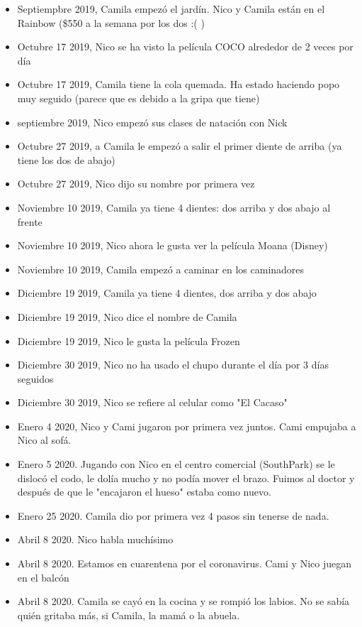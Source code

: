 \documentclass[12pt]{article}
\begin{document}
\begin{itemize}
  \item Septiempbre 2019, Camila empez\'o el jard\'in. Nico y Camila est\'an en el Rainbow (\$550 a la semana por los dos :( )
  \item Octubre 17 2019, Nico se ha visto la pel\'icula COCO alrededor de 2 veces por d\'ia
  \item Octubre 17 2019, Camila tiene la cola quemada. Ha estado haciendo popo muy seguido (parece que es debido a la gripa que tiene)
  \item septiembre 2019, Nico empez\'o sus clases de nataci\'on con Nick
  \item Octubre 27 2019, a Camila le empez\'o a salir el primer diente de arriba (ya tiene los dos de abajo)
  \item Octubre 27 2019, Nico dijo su nombre por primera vez
  \item Noviembre 10 2019, Camila ya tiene 4 dientes: dos arriba y dos abajo al frente
  \item Noviembre 10 2019, Nico ahora le gusta ver la pel\'icula Moana (Disney)
  \item Noviembre 10 2019, Camila empez\'o a caminar en los caminadores
  \item Diciembre 19 2019, Camila ya tiene 4 dientes, dos arriba y dos abajo
  \item Diciembre 19 2019, Nico dice el nombre de Camila
  \item Diciembre 19 2019, Nico le gusta la pel\'icula Frozen
  \item Diciembre 30 2019, Nico no ha usado el chupo durante el d\'ia por 3 d\'ias seguidos
  \item Diciembre 30 2019, Nico se refiere al celular como "El Cacaso"
  \item Enero 4 2020, Nico y Cami jugaron por primera vez juntos. Cami empujaba a Nico al sof\'a.
  \item Enero 5 2020. Jugando con Nico en el centro comercial (SouthPark) se le disloc\'o el codo, le dol\'ia mucho y no pod\'ia mover el brazo. Fuimos al doctor y despu\'es de que le "encajaron el hueso" estaba como nuevo.
  \item Enero 25 2020. Camila dio por primera vez 4 pasos sin tenerse de nada.
  \item Abril 8 2020. Nico habla much\'isimo
  \item Abril 8 2020. Estamos en cuarentena por el coronavirus. Cami y Nico juegan en el balc\'on
  \item Abril 8 2020. Camila se cay\'o en la cocina y se rompi\'o los labios. No se sab\'ia qui\'en gritaba m\'as, si Camila, la mam\'a o la abuela.

\end{itemize}
\end{document}
